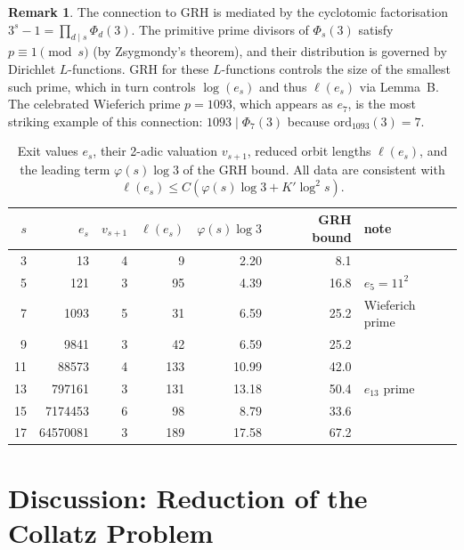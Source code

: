 \documentclass[12pt]{amsart}
\theoremstyle{definition}
\newtheorem{remark}[theorem]{Remark}
\begin{document}
\begin{remark}
  The connection to GRH is mediated by the cyclotomic factorisation
  $3^s - 1 = \prod_{d \mid s} \Phi_d(3)$.  The primitive prime divisors
  of $\Phi_s(3)$ satisfy $p \equiv 1 \pmod{s}$ (by Zsygmondy's theorem),
  and their distribution is governed by Dirichlet $L$-functions.
  GRH for these $L$-functions controls the size of the smallest such prime,
  which in turn controls $\log(e_s)$ and thus $\ell(e_s)$ via Lemma~B.
  The celebrated Wieferich prime $p = 1093$, which appears as $e_7$,
  is the most striking example of this connection: $1093 \mid \Phi_7(3)$
  because $\mathrm{ord}_{1093}(3) = 7$.
\end{remark}

\begin{table}[ht]
\centering
\renewcommand{\arraystretch}{1.3}
\begin{tabular}{@{}rrrrrrl@{}}
\toprule
$s$ & $e_s$ & $v_{s+1}$ & $\ell(e_s)$ & $\varphi(s)\log 3$ & GRH bound & note \\
\midrule
 3 &            13 & 4 &   9 &  2.20 &   8.1 & \\
 5 &           121 & 3 &  95 &  4.39 &  16.8 & $e_5 = 11^2$ \\
 7 &          1093 & 5 &  31 &  6.59 &  25.2 & Wieferich prime \\
 9 &          9841 & 3 &  42 &  6.59 &  25.2 & \\
11 &         88573 & 4 & 133 & 10.99 &  42.0 & \\
13 &        797161 & 3 & 131 & 13.18 &  50.4 & $e_{13}$ prime \\
15 &       7174453 & 6 &  98 &  8.79 &  33.6 & \\
17 &      64570081 & 3 & 189 & 17.58 &  67.2 & \\
\bottomrule
\end{tabular}
\caption{Exit values $e_s$, their 2-adic valuation $v_{s+1}$, reduced orbit
lengths $\ell(e_s)$, and the leading term $\varphi(s)\log 3$ of the GRH bound.
All data are consistent with $\ell(e_s) \leq C(\varphi(s)\log 3 + K'\log^2 s)$.}
\label{tab:exitvals}
\end{table}

\section{Discussion: Reduction of the Collatz Problem}\label{sec:discussion}
\end{document}
